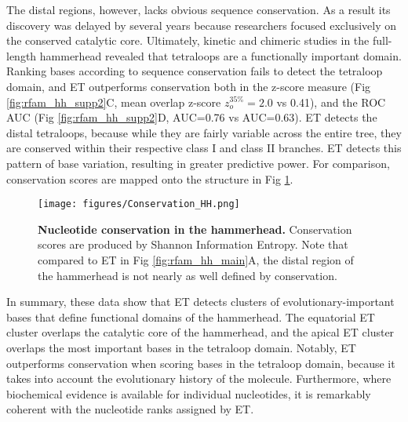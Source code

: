 \documentclass[12pt,a4paper]{report}
\begin{document}
The distal regions, however, lacks obvious sequence conservation. As a result its discovery was delayed by several years because researchers focused exclusively on the conserved catalytic core. Ultimately, kinetic and chimeric studies in the full-length hammerhead \cite{Khvorova2003, Hammann2001} revealed that tetraloops are a functionally important domain. Ranking bases according to sequence conservation fails to detect the tetraloop domain, and ET outperforms conservation both in the z-score measure (Fig \ref{fig:rfam_hh_supp2}C, mean overlap z-score $z_{o}^{35\%}=2.0$  vs 0.41), and the ROC AUC (Fig \ref{fig:rfam_hh_supp2}D, AUC=0.76 vs AUC=0.63). ET detects the distal tetraloops, because while they are fairly variable across the entire tree, they are conserved within their respective class I and class II branches. ET detects this pattern of base variation, resulting in greater predictive power. For comparison, conservation scores are mapped onto the structure in Fig \ref{fig:rfam_hh_supp3}.

\begin{figure}
\begin{minipage}[c][\textheight]{\textwidth}
\vspace*{-4in}
\centering
  \texttt{[image: figures/Conservation\_HH.png]} %
  \caption[Nucleotide conservation in the hammerhead.]{\textbf{Nucleotide conservation in the hammerhead.} Conservation scores are produced by Shannon Information Entropy. Note that compared to  ET in Fig \ref{fig:rfam_hh_main}A, the distal region of the hammerhead is not nearly as well defined by conservation.}
  \label{fig:rfam_hh_supp3}
  \end{minipage}
\end{figure}

In summary, these data show that ET detects clusters of evolutionary-important bases that define functional domains of the hammerhead. The equatorial ET cluster overlaps the catalytic core of the hammerhead, and the apical ET cluster overlaps the most important bases in the tetraloop domain. Notably, ET outperforms conservation when scoring bases in the tetraloop domain, because it takes into account the evolutionary history of the molecule. Furthermore, where biochemical evidence is available for individual nucleotides, it is remarkably coherent with the nucleotide ranks assigned by ET.

\end{document}
